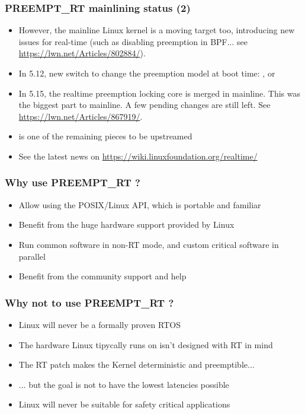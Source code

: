 \begin{frame}
  \frametitle{PREEMPT\_RT mainlining status (2)}
  \begin{itemize}
  \item However, the mainline Linux kernel is a moving target too,
        introducing new issues for real-time (such as disabling preemption in
        BPF... see \url{https://lwn.net/Articles/802884/}).
  \item In 5.12, new  switch to change the preemption
        model at boot time: ,  or
  \item In 5.15, the realtime preemption locking core is merged in mainline.
	This was the biggest part to mainline. A few pending changes are
	still left. See \url{https://lwn.net/Articles/867919/}.
  \item {} is one of the remaining pieces to be upstreamed
  \item See the latest news on \url{https://wiki.linuxfoundation.org/realtime/}
  \end{itemize}
\end{frame}

\begin{frame}
	\frametitle{Why use PREEMPT\_RT ?}
	\begin{itemize}
		\item Allow using the POSIX/Linux API, which is portable and familiar
		\item Benefit from the huge hardware support provided by Linux
		\item Run common software in non-RT mode, and custom critical software in parallel
		\item Benefit from the community support and help
	\end{itemize}
\end{frame}

\begin{frame}
	\frametitle{Why not to use PREEMPT\_RT ?}
	\begin{itemize}
		\item Linux will never be a formally proven RTOS
		\item The hardware Linux tipycally runs on isn't designed with RT in mind
		\item The RT patch makes the Kernel deterministic and preemptible...
		\item ... but the goal is not to have the lowest latencies possible
		\item Linux will never be suitable for safety critical applications
	\end{itemize}
\end{frame}

